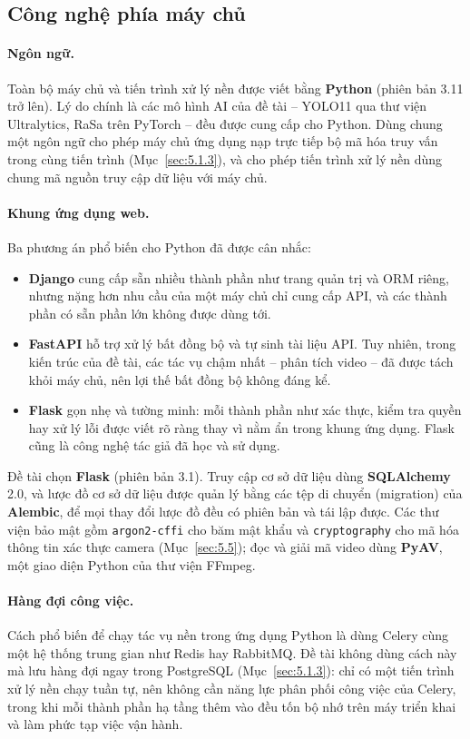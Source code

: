 \subsection{Công nghệ phía máy chủ}
\label{sec:6.1.2}

\paragraph{Ngôn ngữ.} Toàn bộ máy chủ và tiến trình xử lý nền được viết bằng \textbf{Python} (phiên bản 3.11 trở lên). Lý do chính là các mô hình AI của đề tài -- YOLO11 qua thư viện Ultralytics, RaSa trên PyTorch -- đều được cung cấp cho Python. Dùng chung một ngôn ngữ cho phép máy chủ ứng dụng nạp trực tiếp bộ mã hóa truy vấn trong cùng tiến trình (Mục~\ref{sec:5.1.3}), và cho phép tiến trình xử lý nền dùng chung mã nguồn truy cập dữ liệu với máy chủ.

\paragraph{Khung ứng dụng web.} Ba phương án phổ biến cho Python đã được cân nhắc:
\begin{itemize}
    \item \textbf{Django} cung cấp sẵn nhiều thành phần như trang quản trị và ORM riêng, nhưng nặng hơn nhu cầu của một máy chủ chỉ cung cấp API, và các thành phần có sẵn phần lớn không được dùng tới.
    \item \textbf{FastAPI} hỗ trợ xử lý bất đồng bộ và tự sinh tài liệu API. Tuy nhiên, trong kiến trúc của đề tài, các tác vụ chậm nhất -- phân tích video -- đã được tách khỏi máy chủ, nên lợi thế bất đồng bộ không đáng kể.
    \item \textbf{Flask} gọn nhẹ và tường minh: mỗi thành phần như xác thực, kiểm tra quyền hay xử lý lỗi được viết rõ ràng thay vì nằm ẩn trong khung ứng dụng. Flask cũng là công nghệ tác giả đã học và sử dụng.
\end{itemize}
Đề tài chọn \textbf{Flask} (phiên bản 3.1). Truy cập cơ sở dữ liệu dùng \textbf{SQLAlchemy} 2.0, và lược đồ cơ sở dữ liệu được quản lý bằng các tệp di chuyển (migration) của \textbf{Alembic}, để mọi thay đổi lược đồ đều có phiên bản và tái lập được. Các thư viện bảo mật gồm \texttt{argon2-cffi} cho băm mật khẩu và \texttt{cryptography} cho mã hóa thông tin xác thực camera (Mục~\ref{sec:5.5}); đọc và giải mã video dùng \textbf{PyAV}, một giao diện Python của thư viện FFmpeg.

\paragraph{Hàng đợi công việc.} Cách phổ biến để chạy tác vụ nền trong ứng dụng Python là dùng Celery cùng một hệ thống trung gian như Redis hay RabbitMQ. Đề tài không dùng cách này mà lưu hàng đợi ngay trong PostgreSQL (Mục~\ref{sec:5.1.3}): chỉ có một tiến trình xử lý nền chạy tuần tự, nên không cần năng lực phân phối công việc của Celery, trong khi mỗi thành phần hạ tầng thêm vào đều tốn bộ nhớ trên máy triển khai và làm phức tạp việc vận hành.

